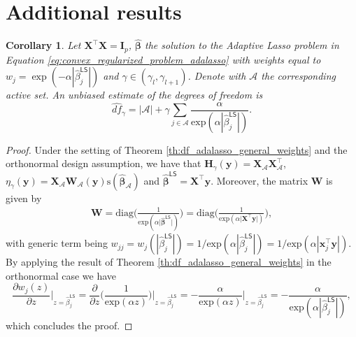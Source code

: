 \documentclass[a4paper, 12pt]{article}
\newcommand{\Aset}{\mathcal{A}}
\newcommand{\sgn}{\mathrm{s}}
\newcommand{\eexp}{\mathrm{exp}}
\newcommand{\betahat}{\widehat{\boldsymbol\beta}}
\newcommand{\T}{\top}
\def\bbeta{\boldsymbol{\beta}}
\def\bx{\boldsymbol{x}}
\def\by{\boldsymbol{y}}
\def\bH{\mathbf{H}}
\def\bI{\mathbf{I}}
\def\bW{\mathbf{W}}
\def\bX{\mathbf{X}}
\def\bx{\mathbf{x}}
\def\by{\mathbf{y}}
\newtheorem{corollary}{Corollary}
\begin{document}
\section{Additional results}
\label{sec:appendix_additional_results}
%
\begin{corollary}
\label{coro:df_adalasso_ortho_exp}
Let $\bX^{\T}\bX=\bI_p$, $\betahat$ the solution to the Adaptive Lasso problem in Equation \eqref{eq:convex_regularized_problem_adalasso} with weights equal to $w_j = \exp(-\alpha|\widehat{\beta}_j^{\mathsf{LS}}|)$ and $\gamma \in (\gamma_l, \gamma_{l+1})$. Denote with $\Aset$ the corresponding active set. An unbiased estimate of the degrees of freedom is
\begin{equation*}
\label{eq:dof_adalasso_ortho_exp}
\widehat{df}_\gamma = \vert\Aset\vert+\gamma\sum_{j\in\Aset} \frac{ \alpha}{\eexp(\alpha|\widehat{\beta}_j^{\mathsf{LS}}|)}.
\end{equation*}
\end{corollary}
\begin{proof}
Under the setting of Theorem \ref{th:df_adalasso_general_weights} and the orthonormal design assumption, we have that $\bH_\gamma(\by) = \bX_{\Aset} \bX_{\Aset}^{\T}$, $\eta_\gamma(\by) = \bX_{\Aset}\bW_{\Aset}(\by)\sgn(\betahat_{\Aset})$ and $\widehat{\bbeta}^{\mathsf{LS}} = \bX^{\T} \by$. Moreover, the matrix $\bW$ is given by
\begin{equation*}
\begin{aligned}
\bW=\mathrm{diag}\Big(\frac{1}{\eexp(\alpha\vert\betahat^{\mathsf{LS}}\vert)}\Big)=\mathrm{diag}\Big(\frac{1}{\eexp(\alpha \vert\bX^{\T}\by\vert)}\Big),
\end{aligned}
\end{equation*}
with generic term being $w_{jj} = w_j(|\widehat{\beta}_j^\mathsf{LS}|) =  1/\eexp(\alpha|\widehat{\beta}^{\mathsf{LS}}_j|) =1/\eexp(\alpha|\bx_j^{\T} \by|)$. By applying the result of Theorem \ref{th:df_adalasso_general_weights}
in the orthonormal case we have 
\begin{equation*}
\frac{\partial w_j(z)}{\partial z} \bigg|_{z=\widehat{\beta}_j^\mathsf{LS}} = \frac{\partial}{\partial z} \bigg( \frac{1}{\eexp(\alpha z)}\bigg)\bigg|_{z=\widehat{\beta}_j^\mathsf{LS}} =  - \frac{\alpha}{\eexp(\alpha z)}\bigg|_{z=\widehat{\beta}_j^\mathsf{LS}} =  - \frac{\alpha}{\eexp(\alpha|\widehat{\beta}_j^\mathsf{LS}|)},
\end{equation*}
which concludes the proof.
\end{proof}
\end{document}
